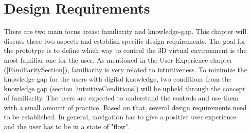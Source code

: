 \section{Design Requirements}
There are two main focus areas: familiarity and knowledge-gap. This chapter will discuss these two aspects and establish specific design requirements. 
The goal for the prototype is to define which way to control the 3D virtual environment is the most familiar one for the user. As mentioned in the User Experience chapter (\ref{FamiliaritySection}), familiarity is very related to intuitiveness.
To minimize the knowledge gap for the users with digital knowledge, two conditions from the knowledge gap (section \ref{intuitiveConditions}) will be upheld through the concept of familiarity. The users are expected to understand the controls and use them with a small amount of practice. Based on that, several design requirements need to be established. In general, navigation has to give a positive user experience and the user has to be in a state of "flow". 

